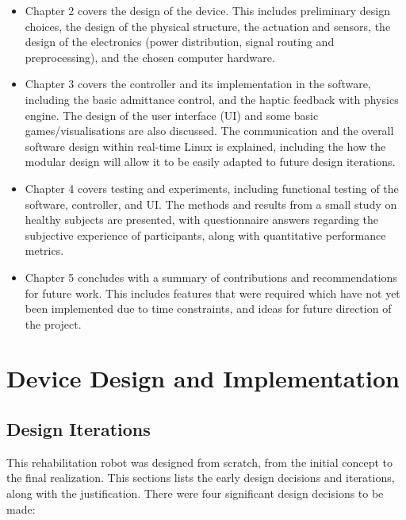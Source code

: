 \documentclass[12pt]{report}
\begin{document}
\begin{itemize}

\item Chapter 2 covers the design of the device. This includes preliminary design choices, the design of the physical structure, the actuation and sensors, the design of the electronics (power distribution, signal routing and preprocessing), and the chosen computer hardware. 

\item Chapter 3 covers the controller and its implementation in the software, including the basic admittance control, and the haptic feedback with physics engine. The design of the user interface (UI) and some basic games/visualisations are also discussed. The communication and the overall software design within real-time Linux is explained, including the how the modular design will allow it to be easily adapted to future design iterations. 

\item Chapter 4 covers testing and experiments, including functional testing of the software, controller, and UI. The methods and results from a small study on healthy subjects are presented, with questionnaire answers regarding the subjective experience of participants, along with quantitative performance metrics. 

\item Chapter 5 concludes with a summary of contributions and recommendations for future work. This includes features that were required which have not yet been implemented due to time constraints, and ideas for future direction of the project. 


\end{itemize}


\chapter{Device Design and Implementation} \label{ch2}

	\section{Design Iterations}
	
	This rehabilitation robot was designed from scratch, from the initial concept to the final realization. This sections lists the early design decisions and iterations, along with the justification. There were four significant design decisions to be made:
	
\end{document}
